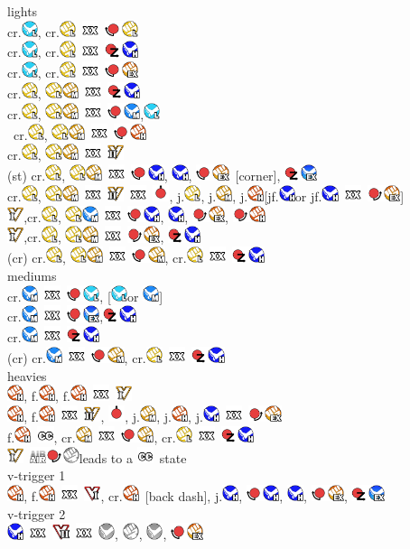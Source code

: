 \documentclass[a4paper]{article}
\newcommand{\dragonpunch}{\includegraphics[height=1.3em]{dp}}
\newcommand{\qcf}{\includegraphics[height=1.3em]{qcf}}
\newcommand{\qcb}{\includegraphics[height=1.3em]{qcb}}
\newcommand{\up}{\includegraphics[height=1.3em]{up}}
\newcommand{\anypunch}{\includegraphics[height=1.3em]{punch}}
\newcommand{\lpunch}{\includegraphics[height=1.3em]{lpunch}}
\newcommand{\mpunch}{\includegraphics[height=1.3em]{mpunch}}
\newcommand{\hpunch}{\includegraphics[height=1.3em]{hpunch}}
\newcommand{\expunch}{\includegraphics[height=1.3em]{expunch}}
\newcommand{\anykick}{\includegraphics[height=1.3em]{kick}}
\newcommand{\lkick}{\includegraphics[height=1.3em]{lkick}}
\newcommand{\mkick}{\includegraphics[height=1.3em]{mkick}}
\newcommand{\hkick}{\includegraphics[height=1.3em]{hkick}}
\newcommand{\exkick}{\includegraphics[height=1.3em]{exkick}}
\newcommand{\vsone}{\includegraphics[height=1.3em]{vskill1}}
\newcommand{\vstwo}{\includegraphics[height=1.3em]{vskill2}}
\newcommand{\vtone}{\includegraphics[height=1.3em]{vtrigger1}}
\newcommand{\vttwo}{\includegraphics[height=1.3em]{vtrigger2}}
\newcommand{\cancel}{\ \includegraphics[height=1.3em]{cancel}\ }
\newcommand{\crush}{\includegraphics[height=1.3em]{crush}}
\newcommand{\air}{\ \includegraphics[height=1.3em]{air}}
\begin{document}
\sffamily

\noindent
lights \\
cr.\lkick, cr.\lpunch\cancel\qcb\lpunch \\
cr.\lkick, cr.\lpunch\cancel\dragonpunch\hkick \\
cr.\lkick, cr.\lpunch\cancel\qcb\expunch \\
cr.\lpunch, \lpunch\mpunch\cancel\dragonpunch\hkick \\
cr.\lpunch, \lpunch\mpunch\cancel\qcb\mkick,\lkick \\\
cr.\lpunch, \lpunch\mpunch\cancel\qcb\hpunch \\
cr.\lpunch, \lpunch\mpunch\cancel\vstwo \\
(st) cr.\lpunch, \lpunch\mpunch\cancel\qcb\hkick, \hkick, \qcb\expunch\ [corner], \dragonpunch\exkick \\
cr.\lpunch, \lpunch\mpunch\cancel\vstwo\cancel\up, j.\lpunch, j.\mpunch, j.\hpunch [jf.\hkick or jf.\hkick\cancel\qcf\expunch] \\
\vsone,cr.\lpunch, \lpunch\mkick\cancel\qcb\hkick, \hkick, \qcf\expunch, \qcf\hpunch \\
\vsone,cr.\lpunch, \lpunch\mpunch\cancel\qcf\expunch, \dragonpunch\hkick \\
(cr) cr.\lpunch, \lpunch\mpunch\cancel\qcb\mpunch, cr.\lpunch\cancel\dragonpunch\hkick \\

\smallbreak
\noindent
mediums \\
cr.\mkick\cancel\qcb\lkick, [\lkick or \mkick] \\
cr.\mkick\cancel\qcb\exkick,\dragonpunch\hkick \\
cr.\mkick\cancel\dragonpunch\hkick \\
(cr) cr.\mkick\cancel\qcb\mpunch, cr.\lpunch\cancel\dragonpunch\hkick \\

\smallbreak
\noindent
heavies \\
\hpunch, f.\hpunch, f.\hpunch\cancel\vsone \\
\hpunch, f.\hpunch\cancel\vstwo, \up, j.\mpunch, j.\hpunch, j.\hkick\cancel\qcf\expunch \\
f.\hpunch\ \crush, cr.\mpunch\cancel\qcb\mpunch, cr.\lpunch\cancel\dragonpunch\hkick \\
\vsone\air\qcf\anypunch leads to a \crush\ state \\

\smallbreak
\noindent
v-trigger 1 \\
\hpunch, f.\hpunch\cancel\vtone, cr.\hpunch\ [back dash], j.\hkick, \qcb\hkick, \hkick, \qcb\expunch, \dragonpunch\exkick \\
v-trigger 2 \\
\hkick\cancel\vttwo\cancel\anykick, \anypunch, \anykick, \qcb\expunch \\
\end{document}

